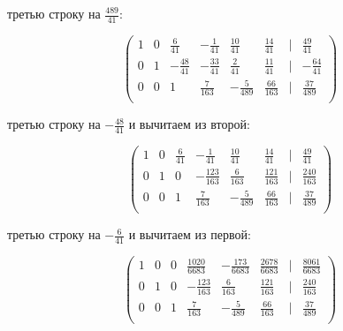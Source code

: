 \documentclass{report}
\begin{document}
\begin{itemize}
\begin{enumerate}
			
			\begin{itemize}
				
				 третью строку на $\frac{489}{41}$:
				
				\begin{center}
					\Large{
						\[
						\begin{pmatrix}
							1 & 0 & \frac{6}{41} & -\frac{1}{41} & \frac{10}{41} & \frac{14}{41} & | & \frac{49}{41} \\
							0 & 1 & -\frac{48}{41} & -\frac{33}{41} & \frac{2}{41} & \frac{11}{41} & | & -\frac{64}{41} \\
							0 & 0 & 1 & \frac{7}{163} & -\frac{5}{489} & \frac{66}{163} & | & \frac{37}{489} \\
						\end{pmatrix}
						\]
					}
				\end{center}
				
				 третью строку на $-\frac{48}{41}$ и вычитаем из второй:
				
				\begin{center}
					\Large{
						\[
						\begin{pmatrix}
							1 & 0 & \frac{6}{41} & -\frac{1}{41} & \frac{10}{41} & \frac{14}{41} & | & \frac{49}{41} \\
							0 & 1 & 0 & -\frac{123}{163} & \frac{6}{163} & \frac{121}{163} & | & \frac{240}{163} \\
							0 & 0 & 1 & \frac{7}{163} & -\frac{5}{489} & \frac{66}{163} & | & \frac{37}{489} \\
						\end{pmatrix}
						\]
					}
				\end{center}
				
				 третью строку на $-\frac{6}{41}$ и вычитаем из первой:
				
				
				\begin{center}
					\Large{
						\[
						\begin{pmatrix}
							1 & 0 & 0 & \frac{1020}{6683} & -\frac{173}{6683} & \frac{2678}{6683} & | & \frac{8061}{6683} \\
							0 & 1 & 0 & -\frac{123}{163} & \frac{6}{163} & \frac{121}{163} & | & \frac{240}{163} \\
							0 & 0 & 1 & \frac{7}{163} & -\frac{5}{489} & \frac{66}{163} & | & \frac{37}{489} \\
						\end{pmatrix}
						\]
					}
				\end{center}
				

\end{itemize}
\end{enumerate}
\end{itemize}
\end{document}
